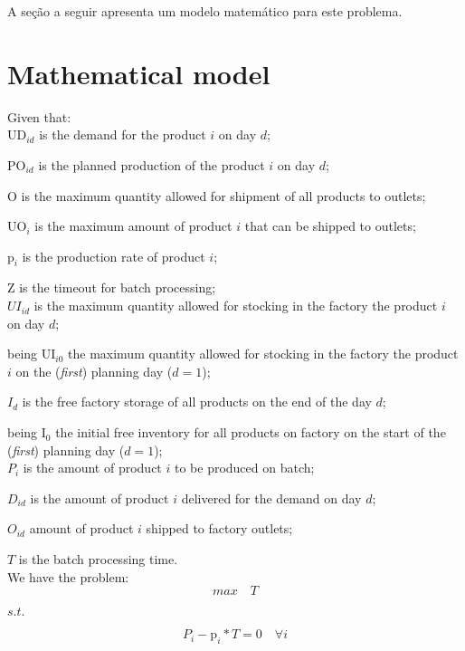 \documentclass[authoryear,preprint,12pt]{elsarticle}
\begin{document}
A seção a seguir apresenta um modelo matemático para este problema.

\section{Mathematical model}
\label{sec:mathModel}

Given that: \\

$\textrm{UD}_{id}$ is the demand for the product $i$ on day $d$;

$\textrm{PO}_{id}$ is the planned production of the product $i$ on day $d$;

$\textrm{O}$ is the maximum quantity allowed for shipment of all products to outlets;

$\textrm{UO}_i$ is the maximum amount of product $i$ that can be shipped to outlets;

$\textrm{p}_i$ is the production rate of product $i$;

$\textrm{Z}$ is the timeout for batch processing; \\

$UI_{id}$ is the maximum quantity allowed for stocking in the factory the product $i$ on day $d$;

being $\textrm{UI}_{i0}$ the maximum quantity allowed for stocking in the factory the product $i$ on the (\emph{first}) planning day ($d=1$);

$I_{d}$ is the free factory storage of all products on the end of the day $d$;

being $\textrm{I}_{0}$ the initial free inventory for all products on factory on the start of the (\emph{first}) planning day ($d=1$); \\

$P_i$ is the amount of product $i$ to be produced on batch;

$D_{id}$ is the amount of product $i$ delivered for the demand on day $d$;

$O_{id}$ amount of product $i$ shipped to factory outlets;

$T$ is the batch processing time. \\

We have the problem: \\

\begin{equation}
max \quad T
\end{equation}

$s.t.$

\begin{equation}
P_i - \textrm{p}_i * T  = 0 \quad \forall i
\end{equation}
\end{document}

